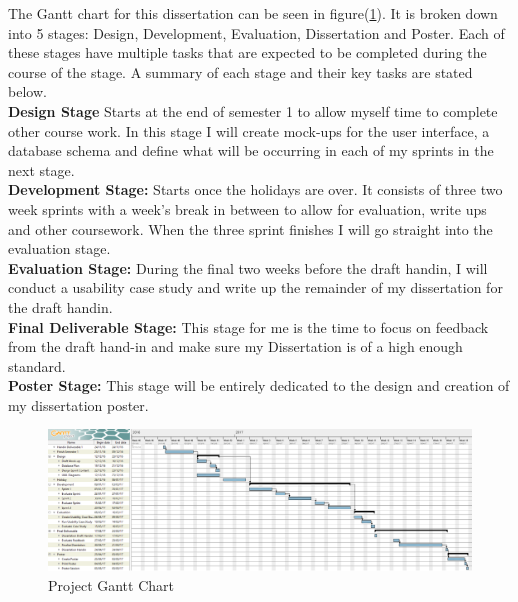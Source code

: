 \documentclass[12pt]{article}  %
\begin{document}
The Gantt chart for this dissertation can be seen in figure(\ref{fig:ganttchart}). It is broken down into 5 stages: Design, Development, Evaluation, Dissertation and Poster. Each of these stages have multiple tasks that are expected to be completed during the course of the stage. A summary of each stage and their key tasks are stated below. \\
\textbf{Design Stage} Starts at the end of semester 1 to allow myself time to complete other course work. In this stage I will create mock-ups for the user interface, a database schema and define what will be occurring in each of my sprints in the next stage.\\
\textbf{Development Stage:} Starts once the holidays are over. It consists of three two week sprints with  a week's break in between to allow for evaluation, write ups and other coursework. When the three sprint finishes I will go straight into the evaluation stage.\\
\textbf{Evaluation Stage: } During the final two weeks before the draft handin, I will conduct a usability case study and write up the remainder of my dissertation for the draft handin.\\
\textbf{Final Deliverable Stage:} This stage  for me is the time to focus on feedback from the draft hand-in and make sure my Dissertation is of a high enough standard.\\
\textbf{Poster Stage:} This stage will be entirely dedicated to the design and creation of my dissertation poster.


\begin{figure}[!htbp]

\includegraphics[width=\textwidth]{images/ganttchart.png}
\caption{Project Gantt Chart}
\label{fig:ganttchart}

\end{figure}




\end{document}
